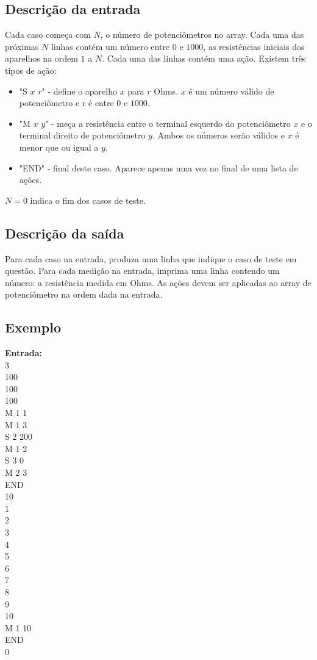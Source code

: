 \subsection{Descrição da entrada}
Cada caso começa com $N$, o número de potenciômetros no array. Cada uma das próximas $N$ linhas contém um número entre $0$ e $1000$, as resistências iniciais dos aparelhos na ordem $1$ a $N$. Cada uma das linhas contém uma ação. Existem três tipos de ação:
\begin{itemize}
    \item "S $x$ $r$" - define o aparelho $x$ para $r$ Ohms. $x$ é um número válido de potenciômetro e r é entre $0$ e $1000$.
    \item "M $x$ $y$" - meça a resistência entre o terminal esquerdo do potenciômetro $x$ e o terminal direito de potenciômetro $y$. Ambos os números serão válidos e $x$ é menor que ou igual a $y$.
    \item "END" - final deste caso. Aparece apenas uma vez no final de uma lista de ações.
\end{itemize}

$N = 0$ indica o fim dos casos de teste.
\subsection{Descrição da saída}
Para cada caso na entrada, produza uma linha que indique o caso de teste em questão.
Para cada medição na entrada, imprima uma linha contendo um número: a resistência medida
em Ohms. As ações devem ser aplicadas ao array de potenciômetro na ordem dada na entrada.
\subsection{Exemplo}
\textbf{Entrada:} \\
3 \\
100 \\
100 \\
100 \\
M 1 1 \\
M 1 3 \\
S 2 200 \\
M 1 2 \\ 
S 3 0 \\
M 2 3 \\
END \\
10 \\
1 \\
2 \\
3 \\
4 \\
5 \\
6 \\
7 \\
8 \\
9 \\
10 \\
M 1 10 \\
END \\
0 \\

